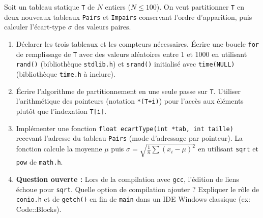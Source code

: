 \documentclass[11pt]{article}
\begin{document}
\begin{exercice}
Soit un tableau statique \texttt{T} de $N$ entiers ($N \le 100$). On veut partitionner \texttt{T} en deux nouveaux tableaux \texttt{Pairs} et \texttt{Impairs} conservant l'ordre d'apparition, puis calculer l'écart-type $\sigma$ des valeurs paires.
\begin{enumerate}
    \item Déclarer les trois tableaux et les compteurs nécessaires. Écrire une boucle \texttt{for} de remplissage de \texttt{T} avec des valeurs aléatoires entre 1 et 1000 en utilisant \texttt{rand()} (bibliothèque \texttt{stdlib.h}) et \texttt{srand()} initialisé avec \texttt{time(NULL)} (bibliothèque \texttt{time.h} à inclure).
    \item Écrire l'algorithme de partitionnement en une seule passe sur \texttt{T}. Utiliser l'arithmétique des pointeurs (notation \texttt{*(T+i)}) pour l'accès aux éléments plutôt que l'indexation \texttt{T[i]}.
    \item Implémenter une fonction \texttt{float ecartType(int *tab, int taille)} recevant l'adresse du tableau \texttt{Pairs} (mode d'adressage par pointeur). La fonction calcule la moyenne $\mu$ puis $\sigma = \sqrt{\frac{1}{n}\sum(x_i-\mu)^2}$ en utilisant \texttt{sqrt} et \texttt{pow} de \texttt{math.h}.
    \item \textbf{Question ouverte :} Lors de la compilation avec \texttt{gcc}, l'édition de liens échoue pour \texttt{sqrt}. Quelle option de compilation ajouter ? Expliquer le rôle de \texttt{conio.h} et de \texttt{getch()} en fin de \texttt{main} dans un IDE Windows classique (ex: Code::Blocks).
\end{enumerate}
\end{exercice}
\end{document}
